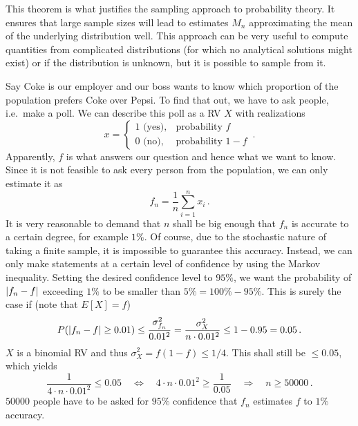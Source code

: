 This theorem is what justifies the sampling approach to probability theory. It ensures that large sample sizes will lead to estimates $M_n$ approximating the mean of the underlying distribution well. This approach can be very useful to compute quantities from complicated distributions (for which no analytical solutions might exist) or if the distribution is unknown, but it is possible to sample from it.


\begin{ex}
Say Coke is our employer and our boss wants to know which proportion of the population prefers Coke over Pepsi. To find that out, we have to ask people, i.e.~make a poll. We can describe this poll as a RV $X$ with realizations
\begin{equation*}
x = \begin{cases} 1 \text{ (yes)}, & \text{probability } f \\ 0 \text{ (no)}, & \text{probability } 1 - f \end{cases} \, .
\end{equation*}
Apparently, $f$ is what answers our question and hence what we want to know. Since it is not feasible to ask every person from the population, we can only estimate it as
\begin{equation*}
f_n = \frac{1}{n} \sum_{i = 1}^n x_i \, .
\end{equation*}
It is very reasonable to demand that $n$ shall be big enough that $f_n$ is accurate to a certain degree, for example $1\%$. Of course, due to the stochastic nature of taking a finite sample, it is impossible to guarantee this accuracy. Instead, we can only make statements at a certain level of confidence by using the Markov inequality. Setting the desired confidence level to $95\%$, we want the probability of $\abs{f_n - f}$ exceeding $1\%$ to be smaller than $5\% = 100\% - 95\%$. This is surely the case if (note that $E[X] = f$)
\begin{equation*}
P(\abs{f_n - f} \geq 0.01) \leq \frac{\sigma_{f_n}^2}{0.01^2} = \frac{\sigma_X^2}{n \cdot 0.01^2} \leq 1 - 0.95 = 0.05 \, .
\end{equation*}
$X$ is a binomial RV and thus $\sigma_X^2 = f (1 - f) \leq 1 / 4$. This shall still be $\leq 0.05$, which yields
\begin{equation*}
\frac{1}{4 \cdot n \cdot 0.01^2} \leq 0.05 \quad \Leftrightarrow \quad 4 \cdot n \cdot 0.01^2 \geq \frac{1}{0.05} \quad \Rightarrow \quad n \geq 50 000 \,. 
\end{equation*}
$50 000$ people have to be asked for $95\%$ confidence that $f_n$ estimates $f$ to $1\%$ accuracy.
\end{ex}


